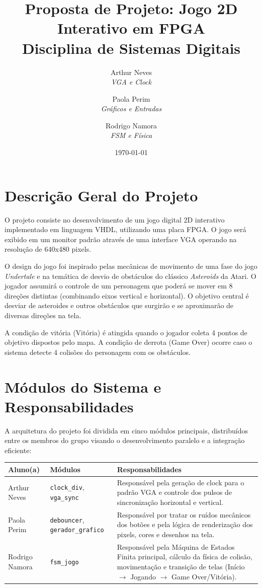 \documentclass[11pt, a4paper]{article}
\title{\vspace{-2cm}\textbf{Proposta de Projeto: Jogo 2D Interativo em FPGA}\\
\large Disciplina de Sistemas Digitais}
\author{
    Arthur Neves\\
    \textit{VGA e Clock}
    \and
    Paola Perim\\
    \textit{Gráficos e Entradas}
    \and
    Rodrigo Namora\\
    \textit{FSM e Física}
}
\date{\today}
\begin{document}
\maketitle

\section{Descrição Geral do Projeto}
O projeto consiste no desenvolvimento de um jogo digital 2D interativo implementado em linguagem VHDL, utilizando uma placa FPGA. O jogo será exibido em um monitor padrão através de uma interface VGA operando na resolução de 640x480 pixels. 

O design do jogo foi inspirado pelas mecânicas de movimento de uma fase do jogo \textit{Undertale} e na temática de desvio de obstáculos do clássico \textit{Asteroids} da Atari. O jogador assumirá o controle de um personagem que poderá se mover em 8 direções distintas (combinando eixos vertical e horizontal). O objetivo central é desviar de asteroides e outros obstáculos que surgirão e se aproximarão de diversas direções na tela.

A condição de vitória (Vitória) é atingida quando o jogador coleta 4 pontos de objetivo dispostos pelo mapa. A condição de derrota (Game Over) ocorre caso o sistema detecte 4 colisões do personagem com os obstáculos.

\section{Módulos do Sistema e Responsabilidades}
A arquitetura do projeto foi dividida em cinco módulos principais, distribuídos entre os membros do grupo visando o desenvolvimento paralelo e a integração eficiente:

\begin{table}[H]
    \centering
    \begin{tabularx}{\textwidth}{l l X}
        \toprule
        \textbf{Aluno(a)} & \textbf{Módulos} & \textbf{Responsabilidades} \\
        \midrule
        Arthur Neves & \texttt{clock\_div}, \texttt{vga\_sync} & Responsável pela geração de clock para o padrão VGA e controle dos pulsos de sincronização horizontal e vertical. \\
        \addlinespace
        Paola Perim & \texttt{debouncer}, \texttt{gerador\_grafico} & Responsável por tratar os ruídos mecânicos dos botões e pela lógica de renderização dos pixels, cores e desenhos na tela. \\
        \addlinespace
        Rodrigo Namora & \texttt{fsm\_jogo} & Responsável pela Máquina de Estados Finita principal, cálculo da física de colisão, movimentação e transição de telas (Início $\rightarrow$ Jogando $\rightarrow$ Game Over/Vitória). \\
        \bottomrule
    \end{tabularx}
\end{table}
\end{document}
